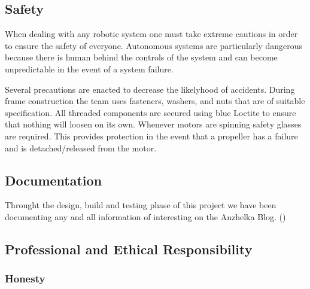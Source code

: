 \documentclass{article}
\numberwithin{equation}{section} %
\begin{document}

\subsection{Safety}

When dealing with any robotic system one must take extreme cautions in order to ensure the safety of everyone. Autonomous systems are particularly dangerous because there is human behind the controls of the system and can become unpredictable in the event of a system failure. 

Several precautions are enacted to decrease the likelyhood of accidents. During frame construction the team uses fasteners, washers, and nuts that are of suitable specification. All threaded components are secured using blue Loctite to ensure that nothing will loosen on its own. Whenever motors are spinning safety glasses are required. This provides protection in the event that a propeller has a failure and is detached/released from the motor.

\subsection{Documentation}
Throught the design, build and testing phase of this project we have been documenting any and all information of interesting on the Anzhelka Blog. (\cite{anzhelka_blog})

\subsection{Professional and Ethical Responsibility}

\subsubsection{Honesty}
\end{document}
